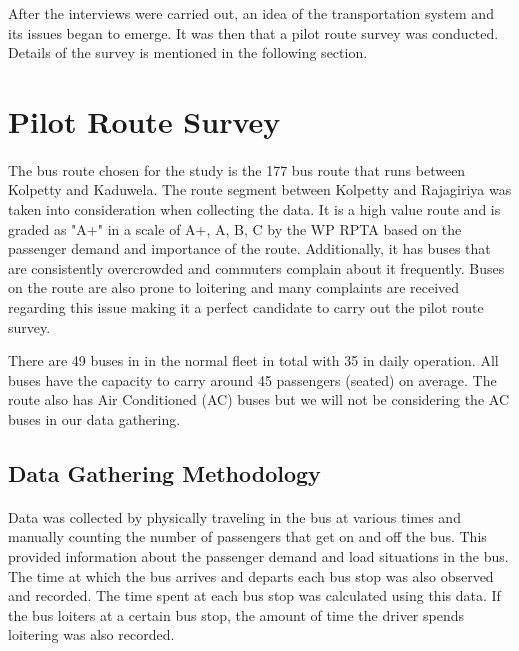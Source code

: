 After the interviews were carried out, an idea of the transportation system and its issues began to emerge. It was then that a pilot route survey was conducted. Details of the survey is mentioned in the following section.



\section{Pilot Route Survey}

\paragraph{ } The bus route chosen for the study is the 177 bus route that runs between Kolpetty and Kaduwela. The route segment between Kolpetty and Rajagiriya was taken into consideration when collecting the data. It is a high value route and is graded as "A+" in a scale of A+, A, B, C by the WP RPTA based on the passenger demand and importance of the route. Additionally, it has buses that are consistently overcrowded and commuters complain about it frequently. Buses on the route are also prone to loitering and many complaints are received regarding this issue making it a perfect candidate to carry out the pilot route survey.

There are 49 buses in in the normal fleet in total with 35 in daily operation. All buses have the capacity to carry around 45 passengers (seated) on average. The route also has Air Conditioned (AC) buses but we will not be considering the AC buses in our data gathering.

\subsection{Data Gathering Methodology}

\paragraph{ } Data was collected by physically traveling in the bus at various times and manually counting the number of passengers that get on and off the bus. This provided information about the passenger demand and load situations in the bus. The time at which the bus arrives and departs each bus stop was also observed and recorded. The time spent at each bus stop was calculated using this data. If the bus loiters at a certain bus stop, the amount of time the driver spends loitering was also recorded.

